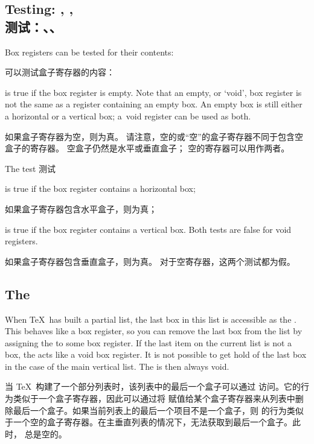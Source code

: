 \subsection{Testing: , , \\测试：、、}

Box
registers can be tested for their contents:

可以测试盒子寄存器的内容：
\begin{disp}\end{disp}
is true if the box register is empty.
Note that an empty, or `void',
box register is not the same as a register containing an empty box.
An empty box is still either a horizontal or a vertical box;
a~void register can be used as both.

如果盒子寄存器为空，则为真。
请注意，空的或“空”的盒子寄存器不同于包含空盒子的寄存器。
空盒子仍然是水平或垂直盒子；
空的寄存器可以用作两者。

The test 测试
\begin{disp}\end{disp}
is true if the box register contains a horizontal box;

如果盒子寄存器包含水平盒子，则为真；

\begin{disp}\end{disp}
is true if the box register contains a vertical box.
Both tests are false for void registers.

如果盒子寄存器包含垂直盒子，则为真。
对于空寄存器，这两个测试都为假。


\subsection{The }
\label{lastbox}

When \TeX\ has built a partial list, the last box in this
list is accessible as the . This behaves
like a box register, so you can remove the last box from  the
list by assigning the  to some  box register. 
If the last item on the current list is not a box,
the  acts like a void box register.
It is not possible to get hold of the last box
in the case of the main vertical list.
The  is then always void.

当 \TeX\ 构建了一个部分列表时，该列表中的最后一个盒子可以通过  访问。它的行为类似于一个盒子寄存器，因此可以通过将  赋值给某个盒子寄存器来从列表中删除最后一个盒子。如果当前列表上的最后一个项目不是一个盒子，则  的行为类似于一个空的盒子寄存器。在主垂直列表的情况下，无法获取到最后一个盒子。此时， 总是空的。

